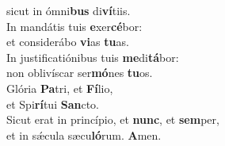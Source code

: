 \evenverse sicut in ómni\textbf{bus} di\textbf{ví}tiis.\\
\oddverse In mandátis tuis \textbf{e}xer\textbf{cé}bor:~\*\\
\oddverse et considerábo \textbf{vi}as \textbf{tu}as.\\
\evenverse In justificatiónibus tuis \textbf{me}di\textbf{tá}bor:~\*\\
\evenverse non oblivíscar ser\textbf{mó}nes \textbf{tu}os.\\
\oddverse Glória \textbf{Pa}tri, et \textbf{Fí}lio,~\*\\
\oddverse et Spi\textbf{rí}tui \textbf{San}cto.\\
\evenverse Sicut erat in princípio, et \textbf{nunc}, et \textbf{sem}per,~\*\\
\evenverse et in sǽcula sæcu\textbf{ló}rum. \textbf{A}men.\\
